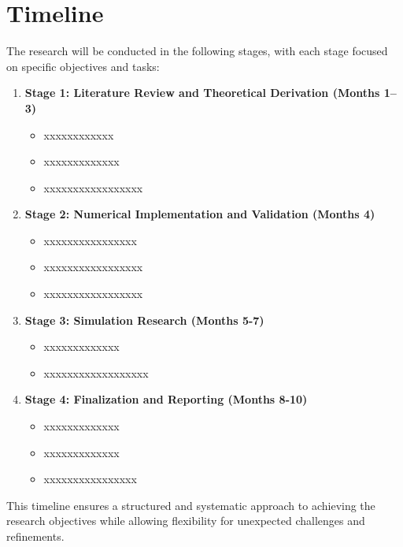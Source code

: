 \chapter{Timeline}

The research will be conducted in the following stages, with each stage focused on specific objectives and tasks:

\begin{enumerate}
    \item \textbf{Stage 1: Literature Review and Theoretical Derivation (Months 1–3)}
    \begin{itemize}
        \item xxxxxxxxxxxx
        \item xxxxxxxxxxxxx
        \item xxxxxxxxxxxxxxxxx
    \end{itemize}

    \item \textbf{Stage 2: Numerical Implementation and Validation (Months 4)}
    \begin{itemize}
        \item xxxxxxxxxxxxxxxx
        \item xxxxxxxxxxxxxxxxx
        \item xxxxxxxxxxxxxxxxx
    \end{itemize}

    \item \textbf{Stage 3: Simulation Research (Months 5-7)}
    \begin{itemize}
        \item xxxxxxxxxxxxx
        \item xxxxxxxxxxxxxxxxxx
    \end{itemize}

    \item \textbf{Stage 4: Finalization and Reporting (Months 8-10)}
    \begin{itemize}
        \item xxxxxxxxxxxxx
        \item xxxxxxxxxxxxx
        \item xxxxxxxxxxxxxxxx
    \end{itemize}
\end{enumerate}

This timeline ensures a structured and systematic approach to achieving the research objectives while allowing flexibility for unexpected challenges and refinements.
